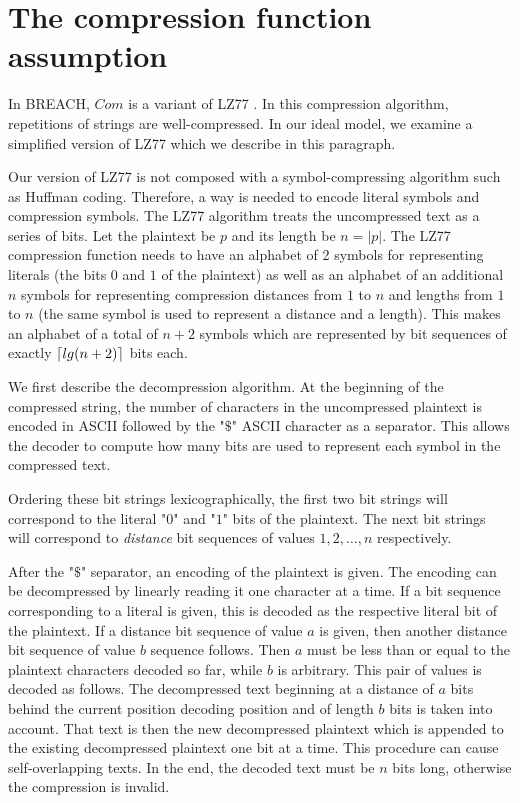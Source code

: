 \documentclass[conference, letterpaper, 10pt]{IEEEtran}
\DeclarePairedDelimiter{\ceil}{\lceil}{\rceil}
\begin{document}
\section{The compression function assumption}\label{subsec:comfuncassumption}

In BREACH, $Com$ is a variant of LZ77 \cite{c9}. In this compression algorithm,
repetitions of strings are well-compressed. In our ideal model, we examine a
simplified version of LZ77 which we describe in this paragraph.

Our version of LZ77 is not composed with a symbol-compressing algorithm such as
Huffman coding. Therefore, a way is needed to encode literal symbols and
compression symbols. The LZ77 algorithm treats the uncompressed text as a
series of bits. Let the plaintext be $p$ and its length be $n = |p|$. The LZ77
compression function needs to have an alphabet of 2 symbols for representing
literals (the bits $0$ and $1$ of the plaintext) as well as an alphabet of an
additional $n$ symbols for representing compression distances from $1$ to $n$
and lengths from $1$ to $n$ (the same symbol is used to represent a distance
and a length). This makes an alphabet of a total of $n + 2$ symbols which are
represented by bit sequences of exactly $\ceil{lg(n + 2)}$ bits each.

We first describe the decompression algorithm. At the beginning of the
compressed string, the number of characters in the uncompressed plaintext is
encoded in ASCII followed by the "$\$$" ASCII character as a separator. This
allows the decoder to compute how many bits are used to represent each symbol
in the compressed text.

Ordering these bit strings lexicographically, the first two bit strings will
correspond to the literal "$0$" and "$1$" bits of the plaintext. The next bit
strings will correspond to \textit{distance} bit sequences of values $1, 2,
\ldots, n$ respectively.

After the "$\$$" separator, an encoding of the plaintext is given. The encoding
can be decompressed by linearly reading it one character at a time. If a bit
sequence corresponding to a literal is given, this is decoded as the respective
literal bit of the plaintext. If a distance bit sequence of value $a$ is given,
then another distance bit sequence of value $b$ sequence follows.  Then $a$
must be less than or equal to the plaintext characters decoded so far, while
$b$ is arbitrary. This pair of values is decoded as follows. The decompressed
text beginning at a distance of $a$ bits behind the current position decoding
position and of length $b$ bits is taken into account. That text is then the
new decompressed plaintext which is appended to the existing decompressed
plaintext one bit at a time. This procedure can cause self-overlapping texts.
In the end, the decoded text must be $n$ bits long, otherwise the compression
is invalid.
\end{document}
